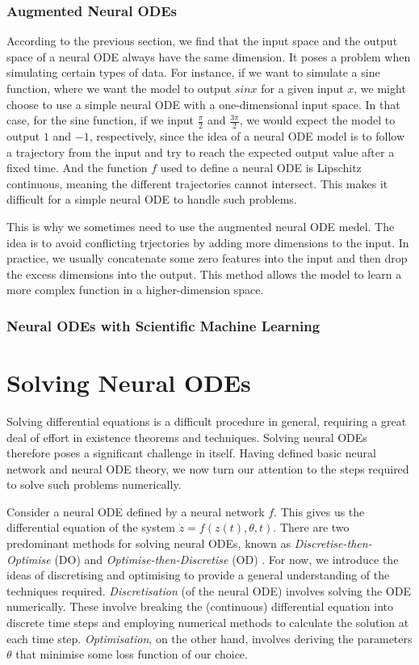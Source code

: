 \documentclass[a4paper,11pt,titlepage]{article}
\theoremstyle{definition}
\theoremstyle{plain}
\theoremstyle{remark}
\begin{document}
\subsubsection{Augmented Neural ODEs}

According to the previous section, we find that the input space and the output space of a neural ODE always have the same dimension. It poses a problem when simulating certain types of data. For instance, if we want to simulate a sine function, where we want the model to output $sin x$ for a given input $x$, we might choose to use a simple neural ODE with a one-dimensional input space. In that case, for the sine function, if we input $\frac{\pi}{2}$ and $\frac{3\pi}{2}$, we would expect the model to output $1$ and $-1$, respectively, since the idea of a neural ODE model is to follow a trajectory from the input and try to reach the expected output value after a fixed time. And the function $f$ used to define a neural ODE is Lipschitz continuous, meaning the different trajectories cannot intersect. This makes it difficult for a simple neural ODE to handle such problems.

This is why we sometimes need to use the augmented neural ODE medel. The idea is to avoid conflicting trjectories by adding more dimensions to the input. In practice, we usually concatenate some zero features into the input and then drop the excess dimensions into the output. This method allows the model to learn a more complex function in a higher-dimension space.

\subsubsection{Neural ODEs with Scientific Machine Learning}

\pagebreak
\section{Solving Neural ODEs}
\label{sec:solvingNODEs}

Solving differential equations is a difficult procedure in general, requiring a great deal of effort in existence theorems and techniques. Solving neural ODEs therefore poses a significant challenge in itself. Having defined basic neural network and neural ODE theory, we now turn our attention to the steps required to solve such problems numerically.

Consider a neural ODE defined by a neural network $f$. This gives us the differential equation of the system $\dot{z}=f(z(t),\theta,t)$. There are two predominant methods for solving neural ODEs, known as \textit{Discretise-then-Optimise} (DO) and \textit{Optimise-then-Discretise} (OD) \cite{kidger2022neural}. For now, we introduce the ideas of discretising and optimising to provide a general understanding of the techniques required. \textit{Discretisation} (of the neural ODE) involves solving the ODE numerically. These involve breaking the (continuous) differential equation into discrete time steps and employing numerical methods to calculate the solution at each time step. \textit{Optimisation}, on the other hand, involves deriving the parameters $\theta$ that minimise some loss function of our choice. 
\end{document}
